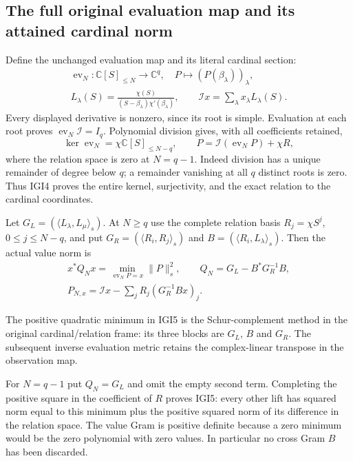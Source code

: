\documentclass[11pt,a4paper]{article}
\begin{document}
\subsection{The full original evaluation map and its attained cardinal norm}
Define the unchanged evaluation map and its literal cardinal section:
\[
\begin{gathered}
 \operatorname{ev}_N:\mathbb C[S]_{\le N}\longrightarrow\mathbb C^q,
   \quad P\longmapsto(P(\beta_\lambda))_\lambda,\\
 L_\lambda(S)=\frac{\chi(S)}{(S-\beta_\lambda)\chi'(\beta_\lambda)},
 \qquad\mathcal I x=\sum_\lambda x_\lambda L_\lambda(S).
\end{gathered}                                                    \tag{IGI3}
\]
Every displayed derivative is nonzero, since its root is simple.
Evaluation at each root proves $\operatorname{ev}_N\mathcal I=I_q$.
Polynomial division gives, with all coefficients retained,
\[
 \ker\operatorname{ev}_N=\chi\mathbb C[S]_{\le N-q},
 \qquad P=\mathcal I(\operatorname{ev}_NP)+\chi R,
                                                               \tag{IGI4}
\]
where the relation space is zero at $N=q-1$. Indeed division has
a unique remainder of degree below $q$; a remainder vanishing at
all $q$ distinct roots is zero. Thus IGI4 proves the entire kernel,
surjectivity, and the exact relation to the cardinal coordinates.

Let $G_L=(\langle L_\lambda,L_\mu\rangle_s)$. At $N\ge q$
use the complete relation basis $R_j=\chi S^j$, $0\le j\le N-q$,
and put $G_R=(\langle R_i,R_j\rangle_s)$ and
$B=(\langle R_i,L_\lambda\rangle_s)$. Then the actual value norm is
\[
\begin{gathered}
 x^*Q_Nx=\min_{\operatorname{ev}_NP=x}\|P\|_s^2,
 \qquad Q_N=G_L-B^*G_R^{-1}B,\\
 P_{N,x}=\mathcal I x-\sum_jR_j(G_R^{-1}Bx)_j .
\end{gathered}                                                    \tag{IGI5}
\]


The positive quadratic minimum in IGI5 is the Schur-complement
method \cite[\S2.1, (2.3)--(2.4)]{human:boyd1994} in the original
cardinal/relation frame: its three blocks are $G_L$, $B$ and $G_R$.
The subsequent inverse evaluation metric retains the complex-linear
transpose in the observation map.

For $N=q-1$ put $Q_N=G_L$ and omit the empty second term.
Completing the positive square in the coefficient of $R$ proves
IGI5: every other lift has squared norm equal to this minimum plus
the positive squared norm of its difference in the relation space.
The value Gram is positive definite because a zero minimum would
be the zero polynomial with zero values. In particular no cross
Gram $B$ has been discarded.
\end{document}
